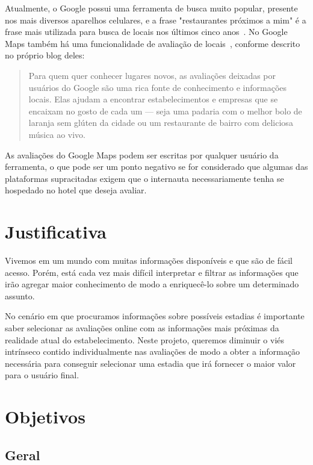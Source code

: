 Atualmente, o Google possui uma ferramenta de busca muito popular, presente nos mais diversos aparelhos celulares, e a frase "restaurantes próximos a mim" é a frase mais utilizada para busca de locais nos últimos cinco anos~\cite{li20213}. No Google Maps também há uma funcionalidade de avaliação de locais~\cite{googleMaps2022Blog}, conforme descrito no próprio blog deles:

\begin{quote}
    Para quem quer conhecer lugares novos, as avaliações deixadas por usuários do Google são uma rica fonte de conhecimento e informações locais. Elas ajudam a encontrar estabelecimentos e empresas que se encaixam no gosto de cada um — seja uma padaria com o melhor bolo de laranja sem glúten da cidade ou um restaurante de bairro com deliciosa música ao vivo.
\end{quote}

As avaliações do Google Maps podem ser escritas por qualquer usuário da ferramenta, o que pode ser um ponto negativo se for considerado que algumas das plataformas supracitadas exigem que o internauta necessariamente tenha se hospedado no hotel que deseja avaliar.

\section{Justificativa}

Vivemos em um mundo com muitas informações disponíveis e que são de fácil acesso. Porém, está cada vez mais difícil interpretar e filtrar as informações que irão agregar maior conhecimento de modo a enriquecê-lo sobre um determinado assunto.

No cenário em que procuramos informações sobre possíveis estadias é importante saber selecionar as avaliações online com as informações mais próximas da realidade atual do estabelecimento. Neste projeto, queremos diminuir o viés intrínseco contido individualmente nas avaliações de modo a obter a informação necessária para conseguir selecionar uma estadia que irá fornecer o maior valor para o usuário final.

\section{Objetivos}

\subsection{Geral}

